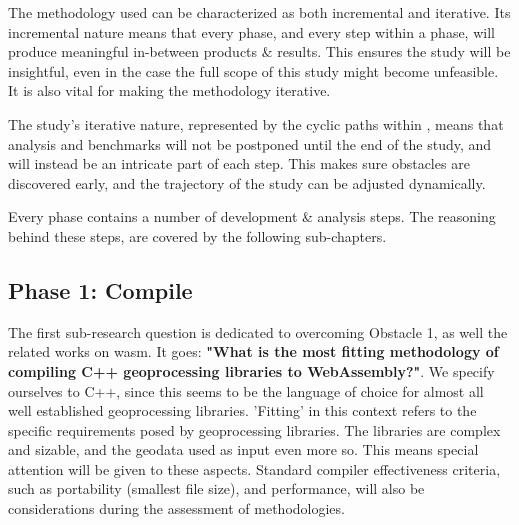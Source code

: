 The methodology used can be characterized as both incremental and iterative. Its incremental nature means that every phase, and every step within a phase, will produce meaningful in-between products \& results. This ensures the study will be insightful, even in the case the full scope of this study might become unfeasible. It is also vital for making the methodology iterative. 

The study's iterative nature, represented by the cyclic paths within , means that analysis and benchmarks will not be postponed until the end of the study, and will instead be an intricate part of each step. This makes sure obstacles are discovered early, and the trajectory of the study can be adjusted dynamically.  

Every phase contains a number of development \& analysis steps. The reasoning behind these steps, are covered by the following sub-chapters.  


\subsection{Phase 1: Compile}


The first sub-research question is dedicated to overcoming Obstacle 1, as well the related works on \ac{wasm}. It goes: \textbf{"What is the most fitting methodology of compiling C++ geoprocessing libraries to WebAssembly?"}.
We specify ourselves to C++, since this seems to be the language of choice for almost all well established geoprocessing libraries. 
'Fitting' in this context refers to the specific requirements posed by geoprocessing libraries. 
The libraries are complex and sizable, and the geodata used as input even more so. 
This means special attention will be given to these aspects. 
Standard compiler effectiveness criteria, such as portability (smallest file size), and performance, will also be considerations during the assessment of methodologies.  

